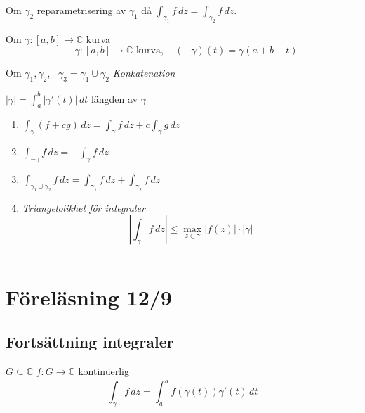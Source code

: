 \begin{theorem}[Proposition 4.2]
Om $\gamma_2$ reparametrisering av $\gamma_1$ då $\displaystyle\int_{\gamma_1} f\,dz = \int_{\gamma_2} f\,dz$.
\end{theorem}

\begin{definition}
Om $\gamma : [a, b] \to \mathbb{C}$ kurva
\[ -\gamma : [a, b] \to \mathbb{C} \text{ kurva}, \quad (-\gamma)(t) = \gamma(a + b - t) \]
\end{definition}

\begin{definition}
Om $\gamma_1, \gamma_2$, \ $\gamma_3 = \gamma_1 \cup \gamma_2$ \qquad \emph{Konkatenation}
\end{definition}

\begin{definition}
$|\gamma| = \displaystyle\int_a^b |\gamma'(t)|\,dt$ \quad längden av $\gamma$
\end{definition}

\begin{theorem}
\begin{enumerate}[label=\textcircled{\alph*}]
  \item $\displaystyle\int_\gamma (f + cg)\,dz = \int_\gamma f\,dz + c\int_\gamma g\,dz$
  \item $\displaystyle\int_{-\gamma} f\,dz = -\int_\gamma f\,dz$
  \item $\displaystyle\int_{\gamma_1 \cup \gamma_2} f\,dz = \int_{\gamma_1} f\,dz + \int_{\gamma_2} f\,dz$
  \item \emph{Triangelolikhet för integraler}
  \[ \left| \int_\gamma f\,dz \right| \le \max_{z \in \gamma} |f(z)| \cdot |\gamma| \]
\end{enumerate}
\end{theorem}

\noindent\rule{\linewidth}{0.4pt}

\section{Föreläsning 12/9}
\subsection{Fortsättning integraler}
$G \subseteq \mathbb{C}$
$f : G \to \mathbb{C}$ kontinuerlig
\[ \int_\gamma f\,dz = \int_a^b f(\gamma(t))\gamma'(t)\,dt \]

